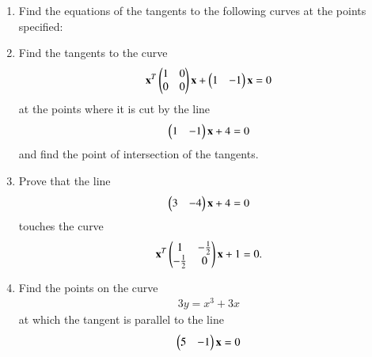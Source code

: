 \renewcommand{\theequation}{\theenumi}
\begin{enumerate}[label=\arabic*.,ref=\thesubsection.\theenumi]
\item Find the equations of the tangents to the following curves at the points specified:
\begin{multicols}{2}
\end{multicols}
\item Find the tangents to the curve 
\begin{align}
\mathbf{x}^T\begin{pmatrix}1 & 0\\0 & 0\end{pmatrix}\mathbf{x} + \begin{pmatrix}1 & -1\end{pmatrix}\mathbf{x}=0
\end{align}
%
 at the points where it is cut by
the line 
\begin{align}
\begin{pmatrix}1 & -1\end{pmatrix}\mathbf{x} + 4 = 0
\end{align}
and find the point of intersection of the tangents.
\item Prove that the line 
\begin{align}
\begin{pmatrix}3 & -4\end{pmatrix}\mathbf{x}+4=0
\end{align}
touches the curve 
\begin{align}
\mathbf{x}^T\begin{pmatrix}1 & -\frac{1}{2}\\ -\frac{1}{2} & 0\end{pmatrix}\mathbf{x} + 1 = 0.
\end{align}
\item Find the points on the curve 
\begin{align}
3y=x^3+3x
\end{align}
at which the tangent is
parallel to the line 
\begin{align}
\begin{pmatrix}5 & -1\end{pmatrix}\mathbf{x} = 0
\end{align}

\end{enumerate}
